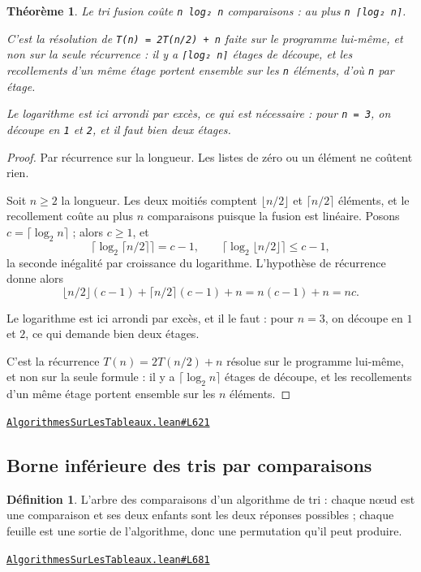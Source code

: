 \documentclass[11pt,a4paper]{article}
\theoremstyle{definition}
\newtheorem{definition}{Définition}
\theoremstyle{plain}
\newtheorem{theoreme}{Théorème}
\newcommand{\source}[2]{\par\smallskip\noindent\hfill{\footnotesize\href{#1}{\texttt{#2}}}\par\smallskip}
\begin{document}
\begin{theoreme}
Le tri fusion coûte \texttt{n log₂ n} comparaisons : au plus \texttt{n ⌈log₂ n⌉}.

C'est la résolution de \texttt{T(n) = 2T(n/2) + n} faite sur le programme lui-même, et non
sur la seule récurrence : il y a \texttt{⌈log₂ n⌉} étages de découpe, et les recollements
d'un même étage portent ensemble sur les \texttt{n} éléments, d'où \texttt{n} par étage.

Le logarithme est ici arrondi par excès, ce qui est nécessaire : pour \texttt{n = 3}, on
découpe en \texttt{1} et \texttt{2}, et il faut bien deux étages.
\end{theoreme}
\begin{proof}
Par récurrence sur la longueur. Les listes de zéro ou un élément ne coûtent rien.

Soit \(n \ge 2\) la longueur. Les deux moitiés comptent \(\lfloor n/2 \rfloor\) et
\(\lceil n/2 \rceil\) éléments, et le recollement coûte au plus \(n\) comparaisons
puisque la fusion est linéaire. Posons \(c = \lceil \log_2 n \rceil\) ; alors
\(c \ge 1\), et
\[ \bigl\lceil \log_2 \lceil n/2 \rceil \bigr\rceil = c - 1 , \qquad
   \bigl\lceil \log_2 \lfloor n/2 \rfloor \bigr\rceil \le c - 1 , \]
la seconde inégalité par croissance du logarithme. L'hypothèse de récurrence donne
alors
\[ \lfloor n/2 \rfloor (c-1) + \lceil n/2 \rceil (c-1) + n = n(c-1) + n = nc . \]

Le logarithme est ici arrondi par excès, et il le faut : pour \(n = 3\), on découpe en
\(1\) et \(2\), ce qui demande bien deux étages.

C'est la récurrence \(T(n) = 2T(n/2) + n\) résolue sur le programme lui-même, et non
sur la seule formule : il y a \(\lceil \log_2 n \rceil\) étages de découpe, et les
recollements d'un même étage portent ensemble sur les \(n\) éléments.
\end{proof}
\source{https://github.com/Commutator-IO/learn-lean/blob/main/courses/02-lycee/11-informatique-nsi/AlgorithmesSurLesTableaux.lean\#L621}{AlgorithmesSurLesTableaux.lean\#L621}

\subsection{Borne inférieure des tris par comparaisons}

\begin{definition}
L'arbre des comparaisons d'un algorithme de tri : chaque nœud est une comparaison
et ses deux enfants sont les deux réponses possibles ; chaque feuille est une sortie
de l'algorithme, donc une permutation qu'il peut produire.
\end{definition}
\source{https://github.com/Commutator-IO/learn-lean/blob/main/courses/02-lycee/11-informatique-nsi/AlgorithmesSurLesTableaux.lean\#L681}{AlgorithmesSurLesTableaux.lean\#L681}
\end{document}
